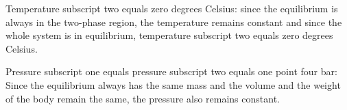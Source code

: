 Temperature subscript two equals zero degrees Celsius: since the equilibrium is always in the two-phase region, the temperature remains constant and since the whole system is in equilibrium, temperature subscript two equals zero degrees Celsius.

Pressure subscript one equals pressure subscript two equals one point four bar: Since the equilibrium always has the same mass and the volume and the weight of the body remain the same, the pressure also remains constant.
